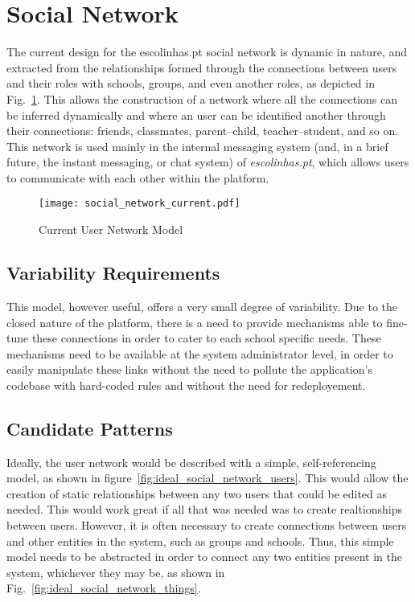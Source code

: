 \section{Social Network}\label{sec:fa_social_network}

The current design for the escolinhas.pt social network is dynamic in nature, and extracted from the relationships formed through the connections between users and their roles with schools, groups, and even another roles, as depicted in Fig.~\ref{fig:social_network_current}. This allows the construction of a network where all the connections can be inferred dynamically and where an user can be identified another through their connections: friends, classmates, parent--child, teacher--student, and so on. This network is used mainly in the internal messaging system (and, in a brief future, the instant messaging, or chat system) of \emph{escolinhas.pt}, which allows users to communicate with each other within the platform.

\begin{figure}[H]
  \centering
  \texttt{[image: social\_network\_current.pdf]}
  \caption{Current User Network Model}
  \label{fig:social_network_current}
\end{figure}

\subsection{Variability Requirements}\label{sec:fa_social_network_variability_requirements}

This model, however useful, offers a very small degree of variability. Due to the closed nature of the platform, there is a need to provide mechanisms able to fine-tune these connections in order to cater to each school specific needs. These mechanisms need to be available at the system administrator level, in order to easily manipulate these links without the need to pollute the application's codebase with hard-coded rules and without the need for redeployement.

\subsection{Candidate Patterns}\label{sec:fa_social_network_candidate_patterns}

Ideally, the user network would be described with a simple, self-referencing model, as shown in figure~\ref{fig:ideal_social_network_users}. This would allow the creation of static relationships between any two users that could be edited as needed. This would work great if all that was needed was to create realtionships between users. However, it is often necessary to create connections between users and other entities in the system, such as groups and schools. Thus, this simple model needs to be abstracted in order to connect any two entities present in the system, whichever they may be, as shown in Fig.~\ref{fig:ideal_social_network_things}.

